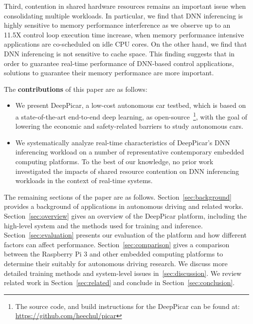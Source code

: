 Third, contention in shared hardware resources remains an important
issue when consolidating multiple workloads. 
In particular, we find that DNN inferencing is highly sensitive to
memory performance interference as we observe up to an 11.5X control
loop execution time increase, when memory performance intensive
applications are co-scheduled on idle CPU cores.
On the other hand, we find that DNN inferencing is not sensitive to
cache space.
This finding
suggests that in order to guarantee real-time performance of DNN-based
control applications, solutions to guarantee their memory performance
are more important.

The {\bf contributions} of this paper are as follows:
\begin{itemize}
  \item We present DeepPicar, a low-cost autonomous car testbed, which
    is based on a state-of-the-art end-to-end deep learning, as 
    open-source~\footnote{The source code, and build 
instructions for the DeepPicar
can be found at: \url{https://github.com/heechul/picar}}, with the
    goal of lowering the economic and safety-related barriers to study
    autonomous cars.

  \item We systematically analyze real-time characteristics of DeepPicar's
    DNN inferencing workload on a number of representative
    contemporary embedded computing platforms. To the
    best of our knowledge, no prior work investigated the
    impacts of shared resource contention on DNN inferencing workloads
    in the context of real-time systems.

\end{itemize}

The remaining sections of the paper are as follows.
Section~\ref{sec:background}
provides a background of applications in autonomous driving and related works.
Section~\ref{sec:overview} gives an overview of the DeepPicar
platform, including the high-level system and the methods used for
training and inference. Section~\ref{sec:evaluation} presents our
evaluation of the platform and how different factors can affect
performance. Section~\ref{sec:comparison} gives a comparison between  
the Raspberry Pi 3 and other embedded computing platforms to 
determine their suitably for autonomous driving research.
We discuss more detailed training methods and system-level issues
in~\ref{sec:discussion}. We review related work in
Section~\ref{sec:related} and conclude in
Section~\ref{sec:conclusion}.

